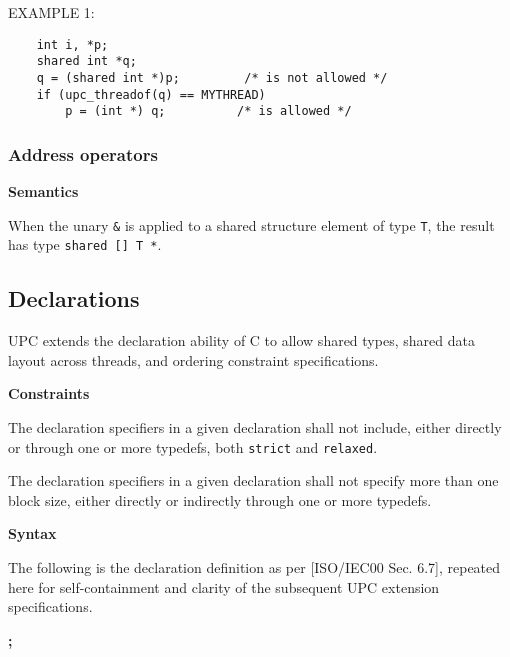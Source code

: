 \np EXAMPLE 1: 
\begin{verbatim}
    int i, *p; 
    shared int *q; 
    q = (shared int *)p;         /* is not allowed */ 
    if (upc_threadof(q) == MYTHREAD)
        p = (int *) q;          /* is allowed */ 
\end{verbatim}

\subsubsection{Address operators}

{\bf Semantics} 

\npf When the unary {\tt \&} is applied to a shared structure
    element of type {\tt T}, the result has type {\tt shared [] T *}.


\subsection{Declarations}

\npf UPC extends the declaration ability of C to allow shared
     types, shared data layout across threads, and ordering constraint
     specifications.

{\bf Constraints} 

\np The declaration specifiers in a given declaration shall
     not include, either directly or through one or more typedefs,
     both {\tt strict} and {\tt relaxed}.

 
\np The declaration specifiers in a given declaration shall
     not specify more than one block size, either directly or
     indirectly through one or more typedefs.

{\bf Syntax} 

\np The following is the declaration definition as per
    [ISO/IEC00 Sec. 6.7], repeated here for self-containment and
    clarity of the subsequent UPC extension specifications.


 {\bf ;}

